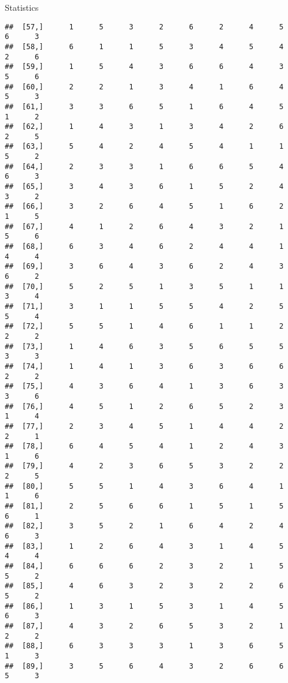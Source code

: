 \documentclass[
  ignorenonframetext,
]{beamer}
\begin{document}
\begin{frame}[fragile]{Statistics}
\begin{verbatim}
##  [57,]      1      5      3      2      6      2      4      5      6      3
##  [58,]      6      1      1      5      3      4      5      4      2      6
##  [59,]      1      5      4      3      6      6      4      3      5      6
##  [60,]      2      2      1      3      4      1      6      4      5      3
##  [61,]      3      3      6      5      1      6      4      5      1      2
##  [62,]      1      4      3      1      3      4      2      6      2      5
##  [63,]      5      4      2      4      5      4      1      1      5      2
##  [64,]      2      3      3      1      6      6      5      4      6      3
##  [65,]      3      4      3      6      1      5      2      4      3      2
##  [66,]      3      2      6      4      5      1      6      2      1      5
##  [67,]      4      1      2      6      4      3      2      1      5      6
##  [68,]      6      3      4      6      2      4      4      1      4      4
##  [69,]      3      6      4      3      6      2      4      3      6      2
##  [70,]      5      2      5      1      3      5      1      1      3      4
##  [71,]      3      1      1      5      5      4      2      5      5      4
##  [72,]      5      5      1      4      6      1      1      2      2      2
##  [73,]      1      4      6      3      5      6      5      5      3      3
##  [74,]      1      4      1      3      6      3      6      6      2      2
##  [75,]      4      3      6      4      1      3      6      3      3      6
##  [76,]      4      5      1      2      6      5      2      3      1      4
##  [77,]      2      3      4      5      1      4      4      2      2      1
##  [78,]      6      4      5      4      1      2      4      3      1      6
##  [79,]      4      2      3      6      5      3      2      2      2      5
##  [80,]      5      5      1      4      3      6      4      1      1      6
##  [81,]      2      5      6      6      1      5      1      5      6      1
##  [82,]      3      5      2      1      6      4      2      4      6      3
##  [83,]      1      2      6      4      3      1      4      5      4      4
##  [84,]      6      6      6      2      3      2      1      5      5      2
##  [85,]      4      6      3      2      3      2      2      6      5      2
##  [86,]      1      3      1      5      3      1      4      5      6      3
##  [87,]      4      3      2      6      5      3      2      1      2      2
##  [88,]      6      3      3      3      1      3      6      5      1      3
##  [89,]      3      5      6      4      3      2      6      6      5      3

\end{verbatim}
\end{frame}
\end{document}
